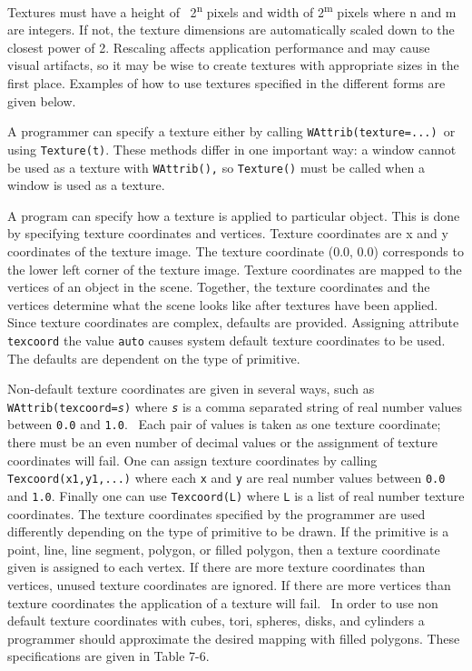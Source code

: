 Textures must have a height of \ 2\textsuperscript{n} pixels and width
of 2\textsuperscript{m} pixels where n and m are integers. If not, the
texture dimensions are automatically scaled down to the closest power
of 2. Rescaling affects application performance and may cause visual
artifacts, so it may be wise to create textures with appropriate sizes
in the first place. Examples of how to use textures specified in the
different forms are given below.

A programmer can specify a texture either by calling
\texttt{WAttrib({\textquotedbl}texture=...{\textquotedbl})}\texttt{ }or
using \texttt{Texture(t)}. These methods differ in one important way: a
window cannot be used as a texture with \texttt{WAttrib(),} so
\texttt{Texture()} must be called when a window is used as a texture.

A program can specify how a texture is applied to particular object.
This is done by specifying texture coordinates and vertices. Texture
coordinates are x and y coordinates of the texture image. The texture
coordinate (0.0, 0.0) corresponds to the lower left corner of the
texture image. Texture coordinates are mapped to the vertices of an
object in the scene. Together, the texture coordinates and the vertices
determine what the scene looks like after textures have been applied.
Since texture coordinates are complex, defaults are provided. Assigning
attribute \texttt{texcoord} the value \texttt{auto} causes system
default texture coordinates to be used. The defaults are dependent on
the type of primitive.

Non-default texture coordinates are given in several ways, such as \linebreak
\texttt{WAttrib({\textquotedbl}texcoord=}\texttt{\textit{s{\textquotedbl}}}\texttt{)}
where \texttt{\textit{s}} is a comma separated string of real number
values between \texttt{0.0} and \texttt{1.0}. \ Each pair of values is
taken as one texture coordinate; there must be an even number of
decimal values or the assignment of texture coordinates will fail. One
can assign texture coordinates by calling \texttt{Texcoord(x1,y1,...)}
where each \texttt{x} and \texttt{y} are real number values between
\texttt{0.0} and \texttt{1.0}. Finally one can use \texttt{Texcoord(L)}
where \texttt{L} is a list of real number texture coordinates. The
texture coordinates specified by the programmer are used differently
depending on the type of primitive to be drawn. If the primitive is a
point, line, line segment, polygon, or filled polygon, then a texture
coordinate given is assigned to each vertex. If there are more texture
coordinates than vertices, unused texture coordinates are ignored. If
there are more vertices than texture coordinates the application of a
texture will fail. \ In order to use non default texture coordinates
with cubes, tori, spheres, disks, and cylinders a programmer should
approximate the desired mapping with filled polygons. These
specifications are given in Table 7-6.

